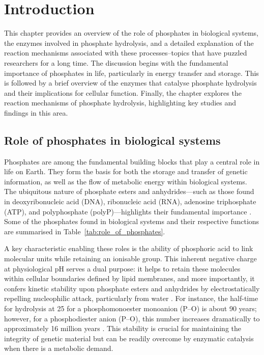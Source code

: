 \chapter{Introduction}
This chapter provides an overview of the role of phosphates in biological systems, the enzymes involved in phosphate hydrolysis, and a detailed explanation of the reaction mechanisms associated with these processes--topics that have puzzled researchers for a long time. The discussion begins with the fundamental importance of phosphates in life, particularly in energy transfer and storage. This is followed by a brief overview of the enzymes that catalyse phosphate hydrolysis and their implications for cellular function. Finally, the chapter explores the reaction mechanisms of phosphate hydrolysis, highlighting key studies and findings in this area.

\section{Role of phosphates in biological systems}
Phosphates are among the fundamental building blocks that play a central role in life on Earth. They form the basis for both the storage and transfer of genetic information, as well as the flow of metabolic energy within biological systems. The ubiquitous nature of phosphate esters and anhydrides—such as those found in deoxyribonucleic acid (DNA), ribonucleic acid (RNA), adenosine triphosphate (ATP), and polyphosphate (polyP)—highlights their fundamental importance \citep{westheimerWhyNatureChose1987}. Some of the phosphates found in biological systems and their respective functions are summarised in Table~\ref{tab:role_of_phosphates}.

A key characteristic enabling these roles is the ability of phosphoric acid to link molecular units while retaining an ionisable group. This inherent negative charge at physiological pH serves a dual purpose: it helps to retain these molecules within cellular boundaries defined by lipid membranes, and more importantly, it confers kinetic stability upon phosphate esters and anhydrides by electrostatically repelling nucleophilic attack, particularly from water \citep{westheimerWhyNatureChose1987}. For instance, the half-time for hydrolysis at 25 for a phosphomonoester monoanion (P–O) is about 90 years; however, for a phosphodiester anion (P–O), this number increases dramatically to approximately 16 million years \citep{wolfendenDegreesDifficultyWaterConsuming2006}. This stability is crucial for maintaining the integrity of genetic material but can be readily overcome by enzymatic catalysis when there is a metabolic demand.


